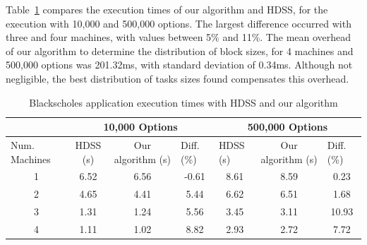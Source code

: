 \documentclass[journal]{IEEEtran}
\begin{document}
Table~\ref{table: black} compares the execution times of our algorithm and HDSS,
for the execution with 10,000 and 500,000 options. The largest difference
occurred with three and four machines, with values between 5\% and 11\%. The
mean overhead of our algorithm to determine the distribution of block sizes, for
4 machines and 500,000 options was 201.32ms, with standard deviation of 0.34ms.
Although not negligible, the best distribution of tasks sizes found compensates
this overhead.





\begin{table}[htb]
\centering
\caption{Blackscholes application execution times with HDSS and our algorithm}
\begin{scriptsize}
\begin{tabular}{c|c|c|c|c|c|c|}
\cline{2-7}
\multicolumn{1}{l|}{}                 & \multicolumn{3}{c|}{10,000 Options}                              & \multicolumn{3}{c|}{500,000 Options}                                                  \\ \hline
\multicolumn{1}{|l|}{Num. Machines} & HDSS (s) & Our algorithm (s) & \multicolumn{1}{l|}{Diff. (\%)} & \multicolumn{1}{l|}{HDSS (s)} & Our algorithm (s) & \multicolumn{1}{l|}{Diff. (\%)} \\ \hline
\multicolumn{1}{|c|}{1 }       & 6.52     & 6.56              &    -0.61                       
			 & 8.61                          & 8.59              &   0.23                         \\ \hline
\multicolumn{1}{|c|}{2 }      & 4.65     & 4.41              &    5.44                         
				& 6.62                          & 6.51              & 1.68                            \\ \hline
\multicolumn{1}{|c|}{3 }      & 1.31     & 1.24              & 5.56                            
			& 3.45                          & 3.11              &         10.93                    \\ \hline
\multicolumn{1}{|c|}{4 }      & 1.11     & 1.02              & 8.82                       
			    & 2.93                          & 2.72              &         7.72                  \\ \hline
\end{tabular}
\end{scriptsize}
\label{table: black}
\end{table}
\end{document}
